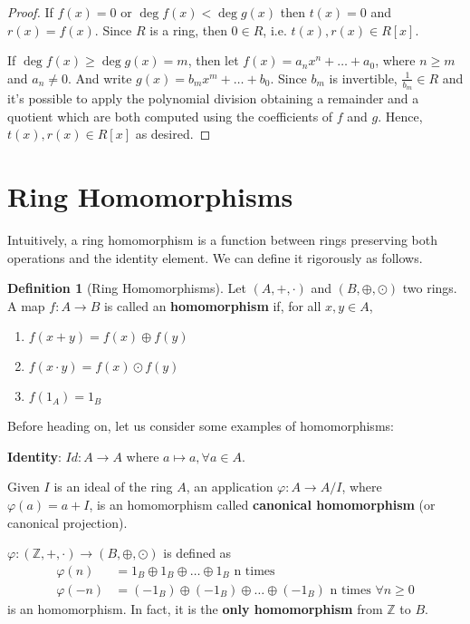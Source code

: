 \documentclass[12pt,a4paper]{article}
\theoremstyle{definition}
\newtheorem{definition}{Definition}[section]
\begin{document}
\begin{proof}
If $f(x) = 0$ or $\deg f(x) < \deg g(x)$ then $t(x) = 0$ and $r(x) = f(x)$. Since $R$ is a ring, then $0 \in R$, i.e. $t(x), r(x) \in R[x]$.

If $\deg f(x) \geq \deg g(x) = m$, then let $f(x) = a_nx^n + \ldots + a_0$, where $n \geq m$ and $a_n \neq 0$. And write $g(x) = b_m x^m + \ldots + b_0$. Since $b_m$ is invertible, $\frac{1}{b_m} \in R$ and it's possible to apply the polynomial division obtaining a remainder and a quotient which are both computed using the coefficients of $f$ and $g$. Hence,  $t(x), r(x) \in R[x]$ as desired.
\end{proof}

\section{Ring Homomorphisms}

Intuitively, a ring homomorphism is a function between rings preserving both operations and the identity element. We can define it rigorously as follows.

\begin{definition}[Ring Homomorphisms]
Let $(A,+, \cdot)$ and $(B,\oplus,\odot)$ two rings. A map $f:A \to B$ is called an \textbf{homomorphism} if, for all $x,y \in A$,
\begin{enumerate}
\item $f(x+y) = f(x) \oplus f(y)$
\item $f(x \cdot y) = f(x) \odot f(y)$
\item $f(1_A) = 1_B$
\end{enumerate}
\end{definition}

Before heading on, let us consider some examples of homomorphisms:

\textbf{Identity}: $Id: A \to A$ where $a \mapsto a, \forall a \in A$.

Given $I$ is an ideal of the ring $A$, an application $\varphi: A \to A/I$, where $\varphi(a) = a+I$, is an homomorphism called \textbf{canonical homomorphism} (or canonical projection).

$\varphi: (\mathbb{Z},+,\cdot) \to (B,\oplus,\odot)$ is defined as
\begin{equation*}
\begin{aligned}
\varphi(n) & = 1_B \oplus 1_B \oplus \ldots \oplus 1_B \text{ n times }\\
\varphi (-n) & = (-1_B) \oplus (-1_B) \oplus \ldots \oplus (-1_B) \text{ n times } \forall n \geq 0
\end{aligned}
\end{equation*}
is an homomorphism. In fact, it is the \textbf{only homomorphism} from $\mathbb{Z}$ to $B$.
\end{document}
